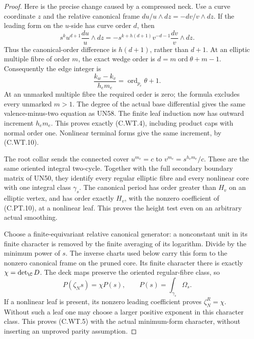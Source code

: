 \begin{proof}
Here is the precise change caused by a
compressed neck. Use a curve coordinate
\(z\) and the relative canonical frame
\(du/u\wedge dz=-dv/v\wedge dz\).
If the leading form on the \(u\)-side has
curve order \(d\), then
\[
 s^k u^{d+1}\frac{du}{u}\wedge dz
      =-s^{k+h(d+1)}v^{-d-1}
                         \frac{dv}{v}\wedge dz .
 \tag{C.WT.12}
\]
Thus the canonical-order difference is
\(h(d+1)\), rather than \(d+1\).
At an elliptic multiple fibre of order \(m\),
the exact wedge order is
\(d=m\operatorname{ord}\theta+m-1\).
Consequently the edge integer is
\[
       \frac{k_w-k_v}{h_e m_e}
                        =\operatorname{ord}_{p_e}\theta+1.
 \tag{C.WT.13}
\]
At an unmarked multiple fibre the required
order is zero; the formula excludes every
unmarked \(m>1\). The degree of the actual
base differential gives the same
valence-minus-two equation as UN58.
The finite leaf induction now has outward
increment \(h_e m_e\). This proves exactly
(C.WT.4), including product caps with
normal order one. Nonlinear terminal
forms give the same increment, by (C.WT.10).

The root collar sends the connected cover
\(u^{m_e}=c\) to
\(v^{m_e}=s^{h_e m_e}/c\). These are the
same oriented integral two-cycle. Together
with the full secondary boundary matrix
of UN50, they identify every regular
elliptic fibre and every nonlinear core
with one integral class \(\gamma_s\).
The canonical period has order greater
than \(H_v\) on an elliptic vertex, and
has order exactly \(H_v\), with the
nonzero coefficient of (C.PT.10), at a
nonlinear leaf. This proves the height
test even on an arbitrary actual
smoothing.

Choose a finite-equivariant relative
canonical generator: a nonconstant unit
in its finite character is removed by
the finite averaging of its logarithm.
Divide by the minimum power of \(s\).
The inverse charts used below carry this
form to the nonzero canonical frame on
the pruned core. Its finite character
there is exactly \(\chi=\det_{\C}D\).
The deck maps preserve the oriented
regular-fibre class, so
\[
 P(\zeta_Ns)=\chi P(s),\qquad
 P(s)=\int_{\gamma_s}\Omega_s .
 \tag{C.WT.14}
\]
If a nonlinear leaf is present, its
nonzero leading coefficient proves
\(\zeta_N^R=\chi\). Without such a leaf
one may choose a larger positive exponent
in this character class. This proves
(C.WT.5) with the actual minimum-form
character, without inserting an
unproved parity assumption.


\end{proof}

